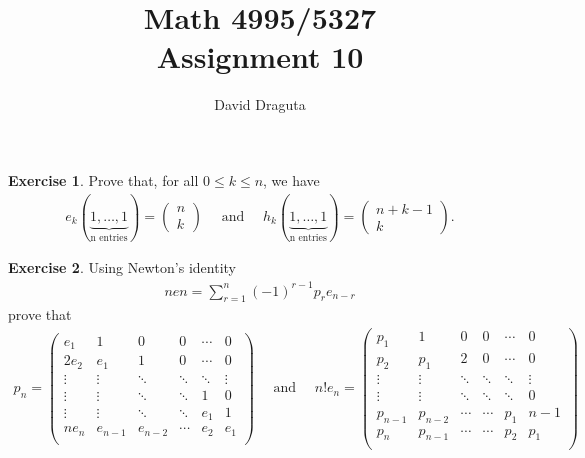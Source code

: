 \documentclass[12pt]{extarticle}
\title{ Math 4995/5327
  \\
  Assignment 10}
\author{David Draguta}
\newcommand{\<}{\langle}
\renewcommand{\>}{\rangle}
\theoremstyle{definition}
\newtheorem{exercise}{Exercise}
\begin{document}
\maketitle

\begin{exercise}
  Prove that, for all $0 \leq k \leq n$, we have
  \begin{align*}
    e_k(\underbrace{1,\dots, 1}_{\text{n entries}}) = 
    \begin{pmatrix}
      n \\
      k
    \end{pmatrix}
    \quad \text{ and } \quad
    h_k(\underbrace{1,\dots, 1}_{\text{n entries}}) = 
    \begin{pmatrix}
      n + k - 1 \\
      k
    \end{pmatrix}.  
  \end{align*}

\end{exercise}

\begin{exercise}
  Using Newton's identity
  \begin{align*}
    nen = \sum\limits_{r=1}^{n}(-1)^{r-1}p_r e_{n-r}
  \end{align*}
  prove that
  \begin{align*}
    p_n = 
    \begin{pmatrix}
      e_1 & 1 & 0 & 0 & \cdots & 0 \\
      2e_2 & e_1 & 1 & 0 & \cdots & 0 \\
      \vdots & \vdots & \ddots & \ddots  & \ddots & \vdots \\
      \vdots & \vdots & \ddots & \ddots  & 1 & 0 \\
      \vdots & \vdots & \ddots & \ddots  & e_1 & 1 \\            
      ne_n & e_{n-1} & e_{n-2} & \cdots  & e_2 & e_1 \\            
    \end{pmatrix}
    \quad \text { and } \quad
    n!e_n = 
    \begin{pmatrix}
      p_1 & 1 & 0 & 0 & \cdots & 0 \\
      p_2 & p_1 & 2 & 0 & \cdots & 0 \\
      \vdots & \vdots & \ddots & \ddots  & \ddots & \vdots \\
      \vdots & \vdots & \ddots & \ddots  & \ddots & 0 \\
      p_{n-1} & p_{n-2} & \cdots & \cdots  & p_1 & n-1 \\            
      p_n & p_{n-1} & \cdots & \cdots  & p_2 & p_1 \\            
    \end{pmatrix}    
  \end{align*}
\end{exercise}
\end{document}

